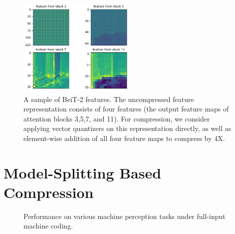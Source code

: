 \documentclass[10pt,twocolumn,letterpaper]{article}
\begin{document}
\begin{figure}
\begin{center}
\includegraphics[width=0.5\textwidth]{Figures/img0_patch0.png}
\end{center}
\caption{\label{fig:beit-features}%
A sample of BeiT-2 features. The uncompressed feature representation consists of four features (the output feature maps of attention blocks 3,5,7, and 11). For compression, we consider applying vector quantizers on this representation directly, as well as element-wise addition of all four feature maps to compress by 4X.}
\end{figure}

\section{Model-Splitting Based Compression}




\begin{figure}
\begin{center}
\end{center}
\caption{\label{fig:example}%
Performance on various machine perception tasks under full-input machine coding.}
\end{figure}
\end{document}
